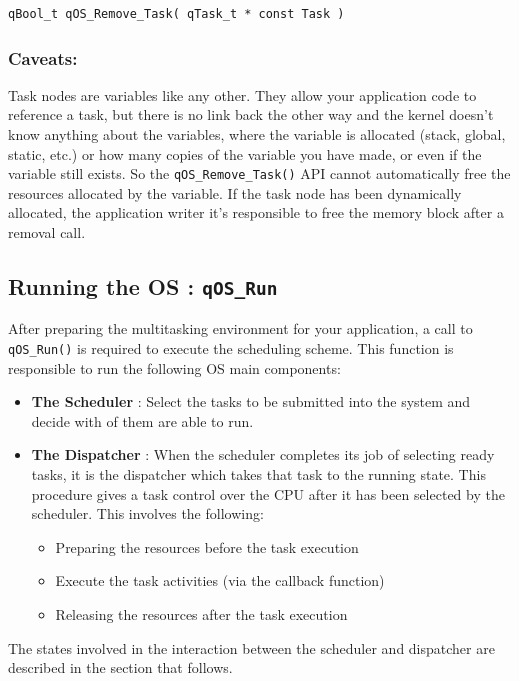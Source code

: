 \documentclass{article}
\begin{document}
\begin{lstlisting}[style=CStyle]
qBool_t qOS_Remove_Task( qTask_t * const Task )
\end{lstlisting}

\subsubsection*{Caveats:}
Task nodes are variables like any other. They allow your application code to reference a task, but there is no link back the other way and the kernel doesn't know anything about the variables, where the variable is allocated (stack, global, static, etc.) or how many copies of the variable you have made, or even if the variable still exists.  So the \lstinline{qOS_Remove_Task()} API cannot automatically free the resources allocated by the variable. 
If the task node has been dynamically allocated, the application writer it's responsible to free the memory block after a removal call.


\subsection{Running the OS : \lstinline{qOS_Run}}
After preparing the multitasking environment for your application, a call to \lstinline{qOS_Run()}  is required to execute the scheduling scheme.
This function is responsible to run the following OS main components:
\begin{itemize}
    \item \textbf{The Scheduler} : Select the tasks to be submitted into the system and decide with of them are able to run.
    \item \textbf{The Dispatcher} : When the scheduler completes its job of selecting ready tasks, it is the dispatcher which takes that task to the running state. This procedure gives a task control over the CPU after it has been selected by the scheduler. This involves the following:
    \begin{itemize}
        \item Preparing the resources before the task execution
        \item Execute the task activities (via the callback function)
        \item Releasing the resources after the task execution 
    \end{itemize}
\end{itemize}

The states involved in the interaction between the scheduler and dispatcher are described in the section that follows. \\
\end{document}
